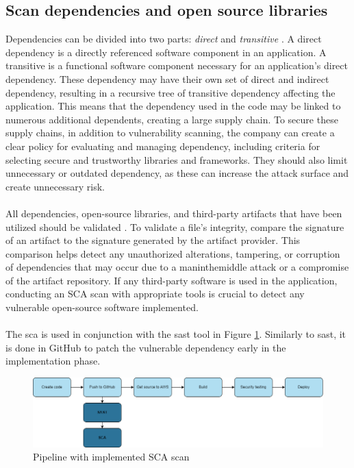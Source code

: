 \subsection{Scan dependencies and open source libraries}
\label{Scan Dependencies and Open Source Libraries}
Dependencies can be divided into two parts: \textit{direct} and \textit{transitive} \cite{googledependency}. A direct dependency is a directly referenced software component in an application. A transitive is a functional software component necessary for an application's direct \gls{dependency}. These \gls{dependency} may have their own set of direct and indirect \gls{dependency}, resulting in a recursive tree of transitive \gls{dependency} affecting the application. This means that the \gls{dependency} used in the code may be linked to numerous additional dependents, creating a large supply chain. To secure these supply chains, in addition to vulnerability scanning, the company can create a clear policy for evaluating and managing \gls{dependency}, including criteria for selecting secure and trustworthy libraries and frameworks. They should also limit unnecessary or outdated \gls{dependency}, as these can increase the attack surface and create unnecessary risk. 
\\~\\
All dependencies, open-source libraries, and third-party \gls{artifact}s that have been utilized should be validated \cite{bestpracticeSupplyChain}. To validate a file's integrity, compare the signature of an artifact to the signature generated by the artifact provider. This comparison helps detect any unauthorized alterations, tampering, or corruption of dependencies that may occur due to a \gls{maninthemiddle} attack or a compromise of the artifact repository. If any third-party software is used in the application, conducting an SCA scan with appropriate tools is crucial to detect any vulnerable open-source software implemented. 
\\~\\
The \acrshort{sca}  is used in conjunction with the \acrshort{sast} tool in Figure \ref{fig: Pipeline with implemented SCA scan}. Similarly to \acrshort{sast}, it is done in GitHub to patch the vulnerable \gls{dependency} early in the implementation phase. \cite{scaplasment}

\vspace{2mm}
\begin{figure}[H]
    \centering
    \includegraphics[width=0.8\columnwidth]{Images/pipeline3.png}
    \caption{Pipeline with implemented SCA scan}
    \label{fig: Pipeline with implemented SCA scan}
\end{figure}

